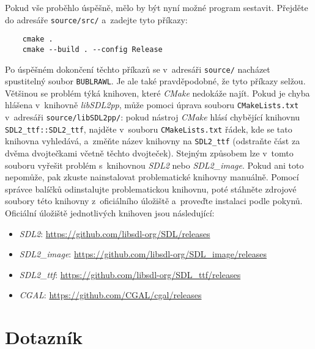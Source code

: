 Pokud vše proběhlo úspěšně, mělo by být nyní možné program sestavit. Přejděte do adresáře \texttt{source/src/} a~zadejte tyto příkazy:
\begin{verbatim}
    cmake .
    cmake --build . --config Release
\end{verbatim}
Po úspěšném dokončení těchto příkazů se v~adresáři \texttt{source/} nacházet spustitelný soubor \texttt{BUBLRAWL}. Je ale také pravděpodobné, že tyto příkazy selžou. Většinou se problém týká knihoven, které \emph{CMake} nedokáže najít. Pokud je chyba hlášena v~knihovně \emph{libSDL2pp}, může pomoci úprava souboru \texttt{CMakeLists.txt} v~adresáři \texttt{source/libSDL2pp/}: pokud nástroj \emph{CMake} hlásí chybějící knihovnu \verb|SDL2_ttf::SDL2_ttf|, najděte v~souboru \texttt{CMakeLists.txt} řádek, kde se tato knihovna vyhledává, a~změňte název knihovny na \verb|SDL2_ttf| (odstraňte část za dvěma dvojtečkami včetně těchto dvojteček). Stejným způsobem lze v~tomto souboru vyřešit problém s~knihovnou \emph{SDL2} nebo \emph{SDL2\_image}. Pokud ani toto nepomůže, pak zkuste nainstalovat problematické knihovny manuálně. Pomocí správce balíčků odinstalujte problematickou knihovnu, poté stáhněte zdrojové soubory této knihovny z~oficiálního úložiště a~proveďte instalaci podle pokynů. Oficiální úložiště jednotlivých knihoven jsou následující:
\begin{itemize}
    \item \emph{SDL2}: \url{https://github.com/libsdl-org/SDL/releases}
    \item \emph{SDL2\_image}: \url{https://github.com/libsdl-org/SDL_image/releases}
    \item \emph{SDL2\_ttf}: \url{https://github.com/libsdl-org/SDL_ttf/releases}
    \item \emph{CGAL}: \url{https://github.com/CGAL/cgal/releases}
\end{itemize}



\chapter{Dotazník}
\label{app:dotaznik}

\newcommand{\questionnairemultipleoptions}[2]{
\noindent\begin{minipage}{\textwidth}
\textbf{#1}\\[1em]
\begin{tikzpicture}
    \pgfkeys{/pgf/number format/use comma}
    \pie[text=legend, before number=\pgfmathprintnumber, radius=2.5]{#2}
\end{tikzpicture}
\end{minipage}
\bigskip
}

